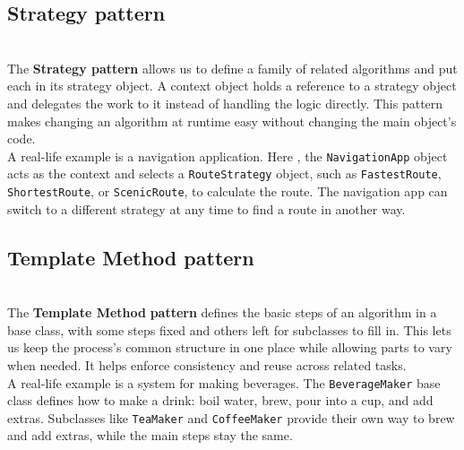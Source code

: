 \subsection{Strategy pattern}\label{AnknGPq_ByyXPFztuxdE6}
\\
The \textbf{Strategy pattern} allows us to define a family of related algorithms and put each in its strategy object. A context object holds a reference to a strategy object and delegates the work to it instead of handling the logic directly. This pattern makes changing an algorithm at runtime easy without changing the main object's code.
\\
A real-life example is a navigation application. Here , the \texttt{NavigationApp} object acts as the context and selects a \texttt{RouteStrategy} object, such as \texttt{FastestRoute}, \texttt{ShortestRoute}, or \texttt{ScenicRoute}, to calculate the route. The navigation app can switch to a different strategy at any time to find a route in another way.

\subsection{Template Method pattern}\label{AY7ctycbNX13kCA3AFRCN}
\\
The \textbf{Template Method} \textbf{pattern} defines the basic steps of an algorithm in a base class, with some steps fixed and others left for subclasses to fill in. This lets us keep the process's common structure in one place while allowing parts to vary when needed. It helps enforce consistency and reuse across related tasks.
\\
A real-life example is a system for making beverages. The
\texttt{BeverageMaker} base class defines how to make a drink: boil water, brew, pour into a cup, and add extras. Subclasses like \texttt{TeaMaker} and \texttt{CoffeeMaker} provide their own way to brew and add extras, while the main steps stay the same.

